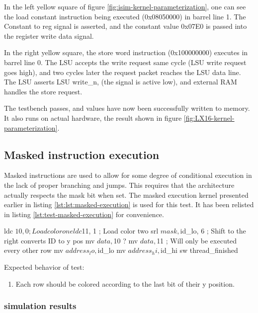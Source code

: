 \documentclass[../main/report.tex]{subfiles}
\begin{document}
In the left yellow square of figure \ref{fig:isim-kernel-parameterization}, one can see the load constant instruction being executed (0x08050000) in barrel line 1.
The Constant to reg signal is asserted, and the constant value 0x07E0 is passed into the register write data signal.

In the right yellow square, the store word instruction (0x100000000) executes in barrel line 0.
The LSU accepts the write request same cycle (LSU write request goes high), and two cycles later the request packet reaches the LSU data line.
The LSU asserts LSU write\_n, (the signal is active low), and external RAM handles the store request.

The testbench passes, and values have now been successfully written to memory.
It also runs on actual hardware, the result shown in figure \ref{fig:LX16-kernel-parameterization}.

\subsection{Masked instruction execution}

Masked instructions are used to allow for some degree of conditional execution in the lack of proper branching and jumps.
This requires that the architecture actually respects the mask bit when set.
The masked execution kernel presented earlier in listing \ref{lst:lst:masked-execution} is used for this test.
It has been relisted in listing \ref{lst:test-masked-execution} for convenience.

\begin{assembly}[caption=Conditional execution using predicated instructions, label=lst:test-masked-execution]
ldc $10, 0 ; Load color one
ldc $11, 1 ; Load color two
srl $mask, $id_lo, 6 ; Shift to the right converts ID to y pos
mv $data, $10
? mv $data, $11 ; Will only be executed every other row
mv $address_lo, $id_lo
mv $address_hi, $id_hi
sw
thread_finished
\end{assembly}

Expected behavior of test:
\begin{enumerate}
  \item
    Each row should be colored according to the last bit of their y position.
\end{enumerate}

\subsubsection*{simulation results}
\end{document}
